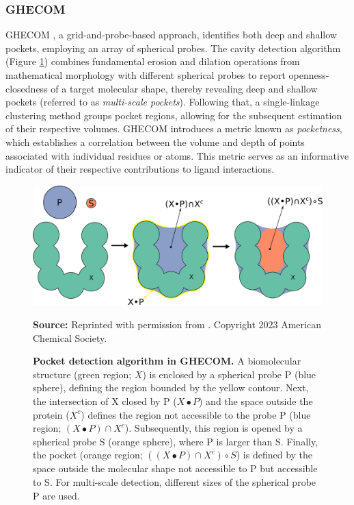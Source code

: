 \documentclass[Ingles]{phdthesis}
\begin{document}
\subsubsection{\acs{GHECOM}}

\ac{GHECOM} \cite{ghecom}, a grid-and-probe-based approach, identifies both deep and shallow pockets, employing an array of spherical probes. The cavity detection algorithm (Figure \ref{fig:ghecom-schema}) combines fundamental erosion and dilation operations from mathematical morphology \cite{matheron1974,serra1982} with different spherical probes to report openness-closedness of a target molecular shape, thereby revealing deep and shallow pockets (referred to as \textit{multi-scale pockets}). Following that, a single-linkage clustering method groups pocket regions, allowing for the subsequent estimation of their respective volumes. \acs{GHECOM} introduces a metric known as \textit{pocketness}, which establishes a correlation between the volume and depth of points associated with individual residues or atoms. This metric serves as an informative indicator of their respective contributions to ligand interactions.

\begin{figure}[H]
  \centerline{\includegraphics[scale=0.9]{images/ghecom-schema.png}}
  \centerline{\tiny{\textbf{Source:} Reprinted with permission from \cite{guerra2023B}. Copyright 2023 American Chemical Society.}}
  \caption[Pocket detection algorithm in \acs{GHECOM}]{\textbf{Pocket detection algorithm in \acs{GHECOM}.} A biomolecular structure (green region; $X$) is enclosed by a spherical probe P (blue sphere), defining the region bounded by the yellow contour. Next, the intersection of X closed by P ($X \bullet P$) and the space outside the protein ($X^c$) defines the region not accessible to the probe P (blue region; $(X \bullet P) \cap X^c$). Subsequently, this region is opened by a spherical probe S (orange sphere), where P is larger than S. Finally, the pocket (orange region; $((X \bullet P) \cap X^c) \circ S$) is defined by the space outside the molecular shape not accessible to P but accessible to S. For multi-scale detection, different sizes of the spherical probe P are used.}
  \label{fig:ghecom-schema}
\end{figure}
\end{document}
